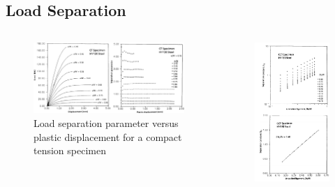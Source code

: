 \subsection{Load Separation}

\begin{frame}
\begin{columns}
\begin{column}{0.6\textwidth}
\begin{figure}
\centering
\includegraphics[width=\columnwidth]{load-separation-side}
\caption{Load separation parameter versus plastic displacement for a compact tension specimen}
\end{figure}
\end{column}
\begin{column}{0.3\textwidth}
\begin{figure}
\centering
\includegraphics[width=0.7\columnwidth]{load-separation-uncracked-ligament}

\end{figure}
\end{column}
\end{columns}
\end{frame}
